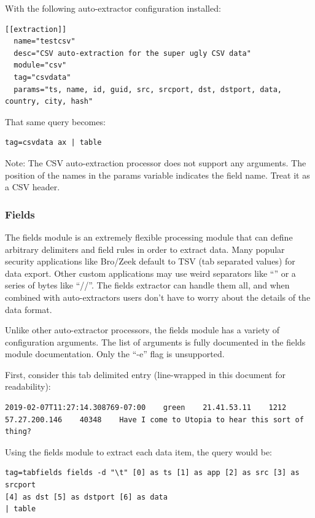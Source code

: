 With the following auto-extractor configuration installed:

\begin{Verbatim}[breaklines=true]
[[extraction]]
  name="testcsv"
  desc="CSV auto-extraction for the super ugly CSV data"
  module="csv"
  tag="csvdata"
  params="ts, name, id, guid, src, srcport, dst, dstport, data, country, city, hash"
\end{Verbatim}

That same query becomes:

\begin{Verbatim}[breaklines=true]
tag=csvdata ax | table
\end{Verbatim}

Note: The CSV auto-extraction processor does not support any
arguments. The position of the names in the params variable indicates
the field name. Treat it as a CSV header.

\subsubsection{Fields}

The fields module is an extremely flexible processing module that can
define arbitrary delimiters and field rules in order to extract data.
Many popular security applications like Bro/Zeek default to TSV (tab
separated values) for data export. Other custom applications may use
weird separators like ``\textbar{}'' or a series of bytes like ``//''. The
fields extractor can handle them all, and when combined with
auto-extractors users don't have to worry about the details of the data
format.

Unlike other auto-extractor processors, the fields module has a variety
of configuration arguments. The list of arguments is fully documented in
the fields module documentation. Only the ``-e'' flag is unsupported.

First, consider this tab delimited entry (line-wrapped in this document for readability):

\begin{Verbatim}[breaklines=true]
2019-02-07T11:27:14.308769-07:00    green    21.41.53.11    1212    
57.27.200.146    40348    Have I come to Utopia to hear this sort of thing?
\end{Verbatim}

Using the fields module to extract each data item, the query would be:

\begin{Verbatim}[breaklines=true]
tag=tabfields fields -d "\t" [0] as ts [1] as app [2] as src [3] as srcport
[4] as dst [5] as dstport [6] as data
| table
\end{Verbatim}

